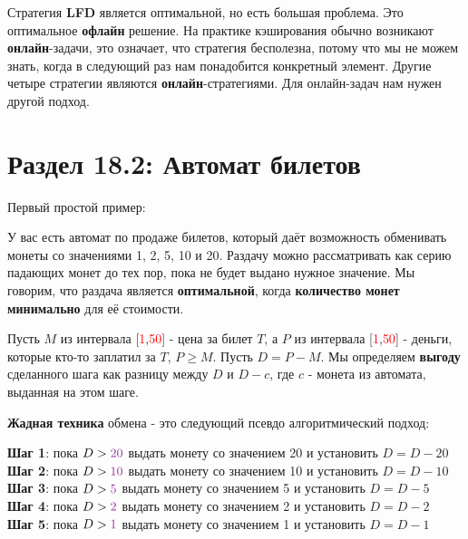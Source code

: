 \vspace{\baselineskip}

Стратегия \textbf{LFD} является оптимальной, но есть большая проблема. Это оптимальное \textbf{офлайн} решение. На практике кэширования обычно возникают \textbf{онлайн}-задачи, это означает, что стратегия бесполезна, потому что мы не можем знать, когда в следующий раз нам понадобится конкретный элемент. Другие четыре стратегии являются \textbf{онлайн}-стратегиями. Для онлайн-задач нам нужен другой подход.

\section*{Раздел 18.2: Автомат билетов}

\vspace{\baselineskip}

Первый простой пример:

\vspace{\baselineskip}

У вас есть автомат по продаже билетов, который даёт возможность обменивать монеты со значениями 1, 2, 5, 10 и 20. Раздачу можно рассматривать как серию падающих монет до тех пор, пока не будет выдано нужное значение. Мы говорим, что раздача является \textbf{оптимальной}, когда \textbf{количество монет минимально} для её стоимости.

\vspace{\baselineskip}

Пусть $M$ из интервала [\textcolor{Red}{1},\textcolor{Red}{50}] - цена за билет $T$, а $P$ из интервала [\textcolor{Red}{1},\textcolor{Red}{50}] - деньги, которые кто-то заплатил за $T$, $P \geq M$. Пусть $D = P - M$. Мы определяем \textbf{выгоду} сделанного шага как разницу между $D$ и $D - c$, где $c$ - монета из автомата, выданная на этом шаге.

\vspace{\baselineskip}

\textbf{Жадная техника} обмена - это следующий псевдо алгоритмический подход:

\vspace{\baselineskip}

\textbf{Шаг 1}: пока $D > \textcolor{Purple}{20}$ выдать монету со значением 20 и установить $D = D - 20$ \\
\textbf{Шаг 2}: пока $D > \textcolor{Purple}{10}$ выдать монету со значением 10 и установить $D = D - 10$ \\
\textbf{Шаг 3}: пока $D > \textcolor{Purple}{5}$ выдать монету со значением 5 и установить $D = D - 5$ \\
\textbf{Шаг 4}: пока $D > \textcolor{Purple}{2}$ выдать монету со значением 2 и установить $D = D - 2$ \\
\textbf{Шаг 5}: пока $D > \textcolor{Purple}{1}$ выдать монету со значением 1 и установить $D = D - 1$

